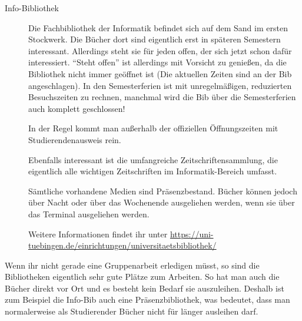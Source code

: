 \begin{description}
	\item[Info-Bibliothek]
	Die Fachbibliothek der Informatik befindet sich auf dem Sand
	im ersten Stockwerk.  Die Bücher dort sind eigentlich erst in
	späteren Semestern interessant.  Aller\-dings steht sie für jeden
	offen, der sich jetzt schon dafür interessiert.  "`Steht
	offen"' ist allerdings mit Vorsicht zu genießen, da die
	Bibliothek nicht immer geöffnet ist (Die aktuellen Zeiten
	sind an der Bib angeschlagen). %
	In den Semesterferien ist mit unregelmäßigen, reduzierten Besuchszeiten zu rechnen, manchmal wird die Bib über die Semesterferien auch komplett geschlossen!
	
	In der Regel kommt man außerhalb der offiziellen Öffnungszeiten mit Studierendenausweis 
	rein. 
	
	Ebenfalls interessant ist die umfangreiche Zeitschriftensammlung,
	die eigentlich alle wichtigen Zeitschriften im
	Informatik-Bereich umfasst.
	
	Sämtliche vorhandene Medien sind Präsenzbestand. Bücher können
	jedoch über Nacht oder über das Wochenende ausgeliehen werden, wenn sie über das Terminal ausgeliehen werden.
	
	Weitere Informationen findet ihr unter \url{https://uni-tuebingen.de/einrichtungen/universitaetsbibliothek/}	%
	
\end{description}

Wenn ihr nicht gerade eine Gruppenarbeit erledigen müsst, so sind die
Bibliotheken eigentlich sehr gute Plätze zum Arbeiten.  So hat man
auch die Bücher direkt vor Ort und es besteht kein Bedarf sie
auszuleihen.  Deshalb ist zum Beispiel die Info-Bib auch eine
Präsenzbibliothek, was bedeutet, dass man normalerweise als
Studierender Bücher nicht für länger ausleihen darf.

